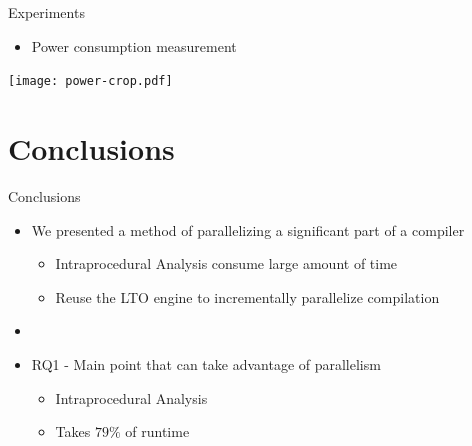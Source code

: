 
\begin{frame}{Experiments}
\begin{itemize}
    \item Power consumption measurement
\end{itemize}
\begin{center}
\texttt{[image: power-crop.pdf]}
\end{center}
\end{frame}

\section{Conclusions}

\begin{frame}{Conclusions}
\begin{itemize}
    \item We presented a method of parallelizing a significant part of a compiler
    \begin{itemize}
        \item Intraprocedural Analysis consume large amount of time
        \item Reuse the LTO engine to incrementally parallelize compilation
    \end{itemize}
    \item[]
    \item RQ1 - Main point that can take advantage of parallelism
    \begin{itemize}
        \item Intraprocedural Analysis
        \item Takes $79\%$ of runtime
    \end{itemize}
\end{itemize}
\end{frame}


